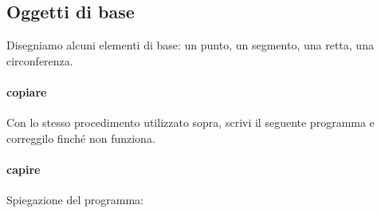 \subsection{Oggetti di base}
\label{subsec:geo_int_oggetti_base}
Disegniamo alcuni elementi di base: un punto, un segmento, una retta, una 
circonferenza.

\paragraph{copiare}

Con lo stesso procedimento utilizzato sopra, scrivi il seguente programma e 
correggilo finché non funziona.




\paragraph{capire}
Spiegazione del programma:

